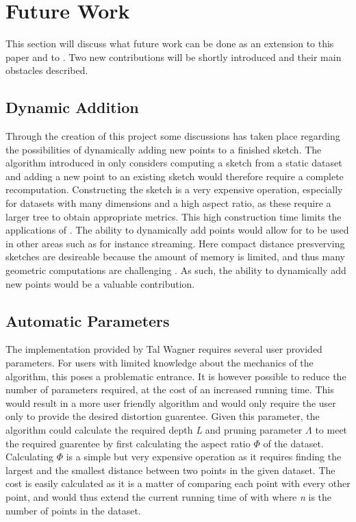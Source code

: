\section{Future Work}
\label{futurework}
This section will discuss what future work can be done as an extension to this paper and to \cite{wagner17}. Two new contributions will be shortly introduced and their main obstacles described. 

\subsection{Dynamic Addition}
Through the creation of this project some discussions has taken place regarding the possibilities of dynamically adding new points to a finished sketch. The algorithm introduced in \cite{wagner17} only considers computing a sketch from a static dataset and adding a new point to an existing sketch would therefore require a complete recomputation. Constructing the sketch is a very expensive operation, especially for datasets with many dimensions and a high aspect ratio, as these require a larger tree to obtain appropriate metrics. This high construction time limits the applications of \qs{}. The ability to dynamically add points would allow for \qs{} to be used in other areas such as for instance streaming. Here compact distance presverving sketches are desireable because the amount of memory is limited, and thus many geometric computations are  challenging \cite{ShanM}. As such, the ability to dynamically add new points would be a valuable contribution. 

\subsection{Automatic Parameters}
The implementation provided by Tal Wagner requires several user provided parameters. For users with limited knowledge about the mechanics of the algorithm, this poses a problematic entrance. It is however possible to reduce the number of parameters required, at the cost of an increased running time. This would result in a more user friendly algorithm and would only require the user only to provide the desired distortion guarentee. Given this parameter, the algorithm could calculate the required depth \textit{L} and pruning parameter $\Lambda$ to meet the required guarentee by first calculating the aspect ratio $\Phi$ of the dataset. Calculating $\Phi$ is a simple but very expensive operation as it requires finding the largest and the smallest distance between two points in the given dataset. The cost is easily calculated as it is a matter of comparing each point with every other point, and would thus extend the current running time of \qs{} with  where \textit{n} is the number of points in the dataset. 

